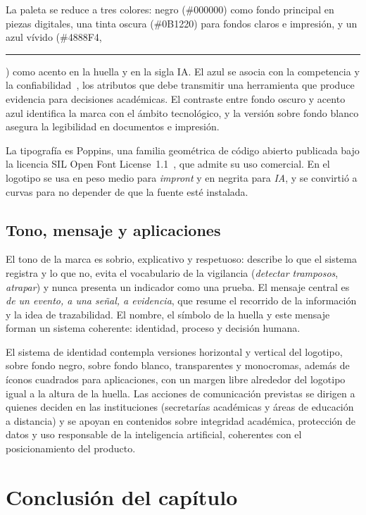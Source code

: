 La paleta se reduce a tres colores: negro (\#000000) como fondo principal en piezas digitales, una tinta oscura (\#0B1220) para fondos claros e impresión, y un azul vívido (\#4888F4, {\color{improntiaazul}\rule{1.2em}{0.8em}}) como acento en la huella y en la sigla IA. El azul se asocia con la competencia y la confiabilidad~\parencite{LabrecqueMilne2012}, los atributos que debe transmitir una herramienta que produce evidencia para decisiones académicas. El contraste entre fondo oscuro y acento azul identifica la marca con el ámbito tecnológico, y la versión sobre fondo blanco asegura la legibilidad en documentos e impresión.

La tipografía es Poppins, una familia geométrica de código abierto publicada bajo la licencia SIL Open Font License~1.1~\parencite{Poppins}, que admite su uso comercial. En el logotipo se usa en peso medio para \textit{impront} y en negrita para \textit{IA}, y se convirtió a curvas para no depender de que la fuente esté instalada.

\subsection{Tono, mensaje y aplicaciones}

El tono de la marca es sobrio, explicativo y respetuoso: describe lo que el sistema registra y lo que no, evita el vocabulario de la vigilancia (\textit{detectar tramposos}, \textit{atrapar}) y nunca presenta un indicador como una prueba. El mensaje central es \textit{de un evento, a una señal, a evidencia}, que resume el recorrido de la información y la idea de trazabilidad. El nombre, el símbolo de la huella y este mensaje forman un sistema coherente: identidad, proceso y decisión humana.

El sistema de identidad contempla versiones horizontal y vertical del logotipo, sobre fondo negro, sobre fondo blanco, transparentes y monocromas, además de íconos cuadrados para aplicaciones, con un margen libre alrededor del logotipo igual a la altura de la huella. Las acciones de comunicación previstas se dirigen a quienes deciden en las instituciones (secretarías académicas y áreas de educación a distancia) y se apoyan en contenidos sobre integridad académica, protección de datos y uso responsable de la inteligencia artificial, coherentes con el posicionamiento del producto.

\section{Conclusión del capítulo}


